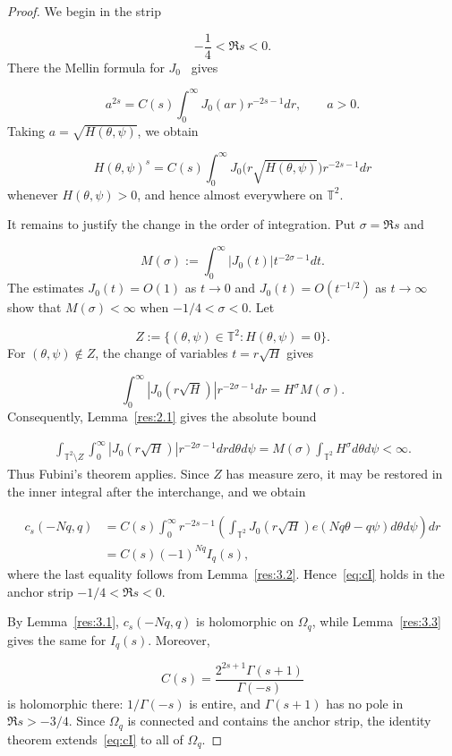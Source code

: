 \documentclass[11pt]{article}
\theoremstyle{plain}
\theoremstyle{definition}
\theoremstyle{remark}
\begin{document}
\begin{proof}
We begin in the strip

\[
  -\frac{1}{4} < \Re s < 0 .
\]
There the Mellin formula for $J_{0}$~\cite[Eq.~10.22.43]{r1} gives

\begin{equation}\label{eq:mellin}
  a^{2s} = C(s) \int_{0}^{\infty } J_{0}(ar) r^{-2s-1} dr , \qquad  a > 0 .
\end{equation}
Taking $a = \sqrt{H(\theta ,\psi )}$, we obtain

\[
  H(\theta ,\psi )^s = C(s) \int_{0}^{\infty } J_{0}\big( r\sqrt{H(\theta ,\psi )} \big) r^{-2s-1} dr
\]
whenever $H(\theta ,\psi ) > 0$, and hence almost everywhere on $\mathbb{T}^{2}$.

It remains to justify the change in the order of integration. Put $\sigma = \Re s$ and

\[
  M(\sigma ) := \int_{0}^{\infty } |J_{0}(t)| t^{-2\sigma -1} dt .
\]
The estimates $J_{0}(t) = O(1)$ as $t \to 0$ and $J_{0}(t) = O(t^{-1/2})$ as $t \to \infty$ show that $M(\sigma ) < \infty$ when $-1/4 < \sigma < 0$. Let

\[
  Z := \{ (\theta ,\psi ) \in \mathbb{T}^{2} : H(\theta ,\psi ) = 0 \} .
\]
For $(\theta ,\psi ) \notin Z$, the change of variables $t = r\sqrt{H}$ gives

\[
  \int_{0}^{\infty } |J_{0}(r\sqrt{H})| r^{-2\sigma -1} dr = H^\sigma M(\sigma ) .
\]
Consequently, Lemma~\ref{res:2.1} gives the absolute bound

\begin{align*}
  \int_{\mathbb{T}^{2}\setminus Z} \int_{0}^{\infty } |J_{0}(r\sqrt{H})| r^{-2\sigma -1} dr d\theta d\psi
  = M(\sigma ) \int_{\mathbb{T}^{2}} H^\sigma d\theta d\psi < \infty .
\end{align*}
Thus Fubini's theorem applies. Since $Z$ has measure zero, it may be restored in the inner integral after the interchange, and we obtain

\begin{align*}
  c_s(-Nq, q) &= C(s) \int_{0}^{\infty } r^{-2s-1} \left( \int_{\mathbb{T}^{2}} J_{0}(r\sqrt{H}) e(Nq\theta - q\psi ) d\theta d\psi \right) dr \\
  &= C(s) (-1)^{Nq} I_q(s) ,
\end{align*}
where the last equality follows from Lemma~\ref{res:3.2}. Hence~\eqref{eq:cI} holds in the anchor strip $-1/4 < \Re s < 0$.

By Lemma~\ref{res:3.1}, $c_s(-Nq, q)$ is holomorphic on $\Omega_q$, while Lemma~\ref{res:3.3} gives the same for $I_q(s)$. Moreover,

\[
  C(s) = \frac{2^{2s+1}\Gamma (s+1)}{\Gamma (-s)}
\]
is holomorphic there: $1/\Gamma (-s)$ is entire, and $\Gamma (s+1)$ has no pole in $\Re s > -3/4$. Since $\Omega_q$ is connected and contains the anchor strip, the identity theorem extends~\eqref{eq:cI} to all of $\Omega_q$.
\end{proof}
\end{document}
